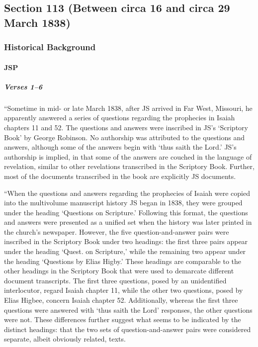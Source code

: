 \subsection{Section 113 (Between circa 16 and circa 29 March 1838)}
	\label{DC113}
	
	\subsubsection{Historical Background}
		\label{DC113-HB}
		
		\paragraph{JSP}
		
			\subparagraph{Verses 1--6}
			
				``Sometime in mid- or late March 1838, after JS arrived in Far West, Missouri, he apparently answered a series of questions regarding the prophecies in Isaiah chapters 11 and 52. The questions and answers were inscribed in JS's `Scriptory Book' by George Robinson. No authorship was attributed to the questions and answers, although some of the answers begin with `thus saith the Lord.' JS's authorship is implied, in that some of the answers are couched in the language of revelation, similar to other revelations transcribed in the Scriptory Book. Further, most of the documents transcribed in the book are explicitly JS documents.

				``When the questions and answers regarding the prophecies of Isaiah were copied into the multivolume manuscript history JS began in 1838, they were grouped under the heading `Questions on Scripture.' Following this format, the questions and answers were presented as a unified set when the history was later printed in the church's newspaper. However, the five question-and-answer pairs were inscribed in the Scriptory Book under two headings: the first three pairs appear under the heading `Quest. on Scripture,' while the remaining two appear under the heading `Questions by Elias Higby.' These headings are comparable to the other headings in the Scriptory Book that were used to demarcate different document transcripts. The first three questions, posed by an unidentified interlocutor, regard Isaiah chapter 11, while the other two questions, posed by Elias Higbee, concern Isaiah chapter 52. Additionally, whereas the first three questions were answered with `thus saith the Lord' responses, the other questions were not. These differences further suggest what seems to be indicated by the distinct headings: that the two sets of question-and-answer pairs were considered separate, albeit obviously related, texts.

